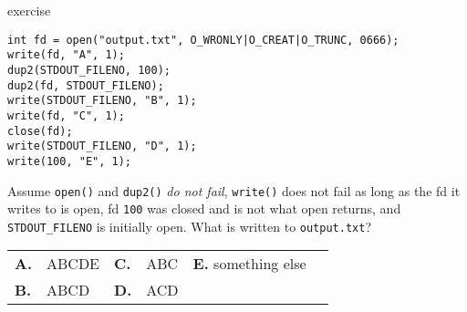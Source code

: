 \begin{frame}[fragile,label=ex]{exercise}
\begin{lstlisting}[style=small]
int fd = open("output.txt", O_WRONLY|O_CREAT|O_TRUNC, 0666);
write(fd, "A", 1);
dup2(STDOUT_FILENO, 100);
dup2(fd, STDOUT_FILENO);
write(STDOUT_FILENO, "B", 1);
write(fd, "C", 1);
close(fd);
write(STDOUT_FILENO, "D", 1);
write(100, "E", 1);
\end{lstlisting}
Assume \texttt{open()} and \texttt{dup2()} \textit{do not fail},
\texttt{write()} does not fail as long as the fd it writes to is open,
fd \texttt{100} was closed and is not what open returns, and \texttt{STDOUT\_FILENO} is initially open.
What is written to \texttt{output.txt}? \\
\begin{tabular}{llllll}
\textbf{A.} & ABCDE & \textbf{C.} & ABC & \textbf{E.} something else \\
\textbf{B.} & ABCD & \textbf{D.} & ACD \\
\end{tabular}
\end{frame}
